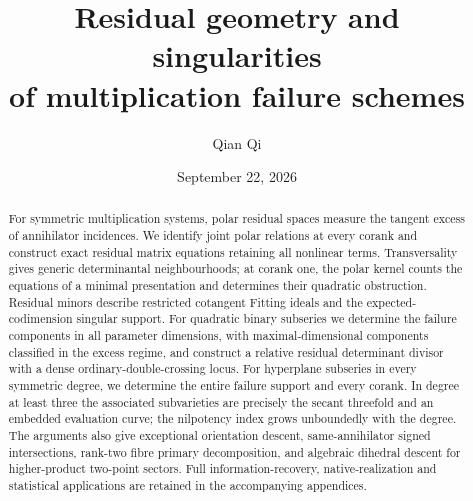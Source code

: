\documentclass[11pt,reqno]{amsart}
\title[Residual geometry of multiplication failure]{Residual geometry and singularities\\of multiplication failure schemes}
\author{Qian Qi}
\date{September 22, 2026}
\numberwithin{equation}{section}
\theoremstyle{definition}\newtheorem{definition}[theorem]{Definition}
\theoremstyle{remark}\newtheorem{remark}[theorem]{Remark}
\begin{document}
\begin{abstract}
For symmetric multiplication systems, polar residual spaces measure the tangent excess of annihilator incidences. We identify joint polar relations at every corank and construct exact residual matrix equations retaining all nonlinear terms. Transversality gives generic determinantal neighbourhoods; at corank one, the polar kernel counts the equations of a minimal presentation and determines their quadratic obstruction. Residual minors describe restricted cotangent Fitting ideals and the expected-codimension singular support. For quadratic binary subseries we determine the failure components in all parameter dimensions, with maximal-dimensional components classified in the excess regime, and construct a relative residual determinant divisor with a dense ordinary-double-crossing locus. For hyperplane subseries in every symmetric degree, we determine the entire failure support and every corank. In degree at least three the associated subvarieties are precisely the secant threefold and an embedded evaluation curve; the nilpotency index grows unboundedly with the degree. The arguments also give exceptional orientation descent, same-annihilator signed intersections, rank-two fibre primary decomposition, and algebraic dihedral descent for higher-product two-point sectors. Full information-recovery, native-realization and statistical applications are retained in the accompanying appendices.
\end{abstract}
\maketitle











\appendix








\end{document}
